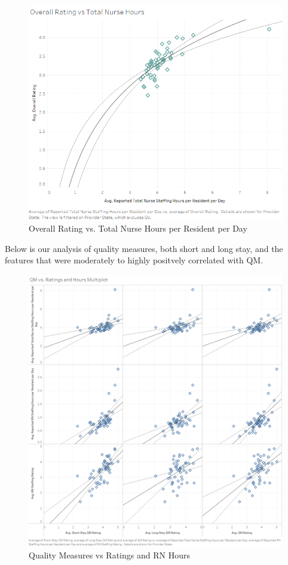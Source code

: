 \documentclass{article}
\theoremstyle{mytheoremstyle}
\theoremstyle{mytheoremstyle}
\theoremstyle{myproblemstyle}
\begin{document}
\begin{figure}[htbp]
\centering
\includegraphics[width=0.7\linewidth]{Images/Overall Rating vs Total Nurse Hours.png}
\caption{Overall Rating vs. Total Nurse Hours per Resident per Day}
\label{Rating by state}
\end{figure}



\pagebreak
Below is our analysis of quality measures, both short and long stay, and the features that were moderately to highly positvely correlated with QM. 
\begin{figure}[htbp]
\centering
\includegraphics[width=\linewidth]{Images/QM vs. Ratings and Hours Multiplot.png}
\caption{Quality Measures vs Ratings and RN Hours}
\label{fig:provEDA}
\end{figure}
\end{document}

